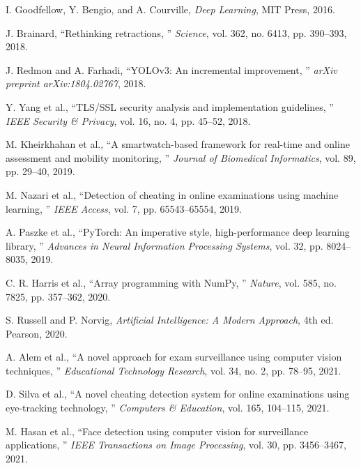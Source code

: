 \documentclass[conference]{IEEEtran}
\begin{document}
\begin{thebibliography}{99}

I. Goodfellow, Y. Bengio, and A. Courville, \textit{Deep Learning}, MIT Press, 2016.

J. Brainard, ``Rethinking retractions, '' \textit{Science}, vol. 362, no. 6413, 
pp. 390--393, 2018.

J. Redmon and A. Farhadi, ``YOLOv3: An incremental improvement, '' 
\textit{arXiv preprint arXiv:1804.02767}, 2018.

Y. Yang et al., ``TLS/SSL security analysis and implementation guidelines, '' 
\textit{IEEE Security \& Privacy}, vol. 16, no. 4, pp. 45--52, 2018.

M. Kheirkhahan et al., ``A smartwatch-based framework for real-time and online 
assessment and mobility monitoring, '' \textit{Journal of Biomedical Informatics}, 
vol. 89, pp. 29--40, 2019.

M. Nazari et al., ``Detection of cheating in online examinations using machine 
learning, '' \textit{IEEE Access}, vol. 7, pp. 65543--65554, 2019.

A. Paszke et al., ``PyTorch: An imperative style, high-performance deep learning 
library, '' \textit{Advances in Neural Information Processing Systems}, vol. 32, 
pp. 8024--8035, 2019.

C. R. Harris et al., ``Array programming with NumPy, '' \textit{Nature}, vol. 585, 
no. 7825, pp. 357--362, 2020.

S. Russell and P. Norvig, \textit{Artificial Intelligence: A Modern Approach}, 
4th ed. Pearson, 2020.

A. Alem et al., ``A novel approach for exam surveillance using computer vision 
techniques, '' \textit{Educational Technology Research}, vol. 34, no. 2, 
pp. 78--95, 2021.

D. Silva et al., ``A novel cheating detection system for online examinations using 
eye-tracking technology, '' \textit{Computers \& Education}, vol. 165, 104--115, 2021.

M. Hasan et al., ``Face detection using computer vision for surveillance 
applications, '' \textit{IEEE Transactions on Image Processing}, vol. 30, 
pp. 3456--3467, 2021.


\end{thebibliography}
\end{document}
